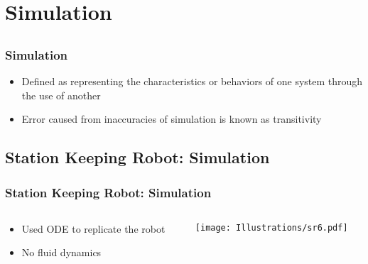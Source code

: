 \documentclass{beamer}
\begin{document}
%


\section{Simulation}

\subsection{}
\begin{frame}
\frametitle{Simulation}
\begin{itemize}
\item Defined as representing the characteristics or behaviors of one system through the use of another
\item Error caused from inaccuracies of simulation is known as transitivity 
\end{itemize}
\end{frame}

\subsection*{Station Keeping Robot: Simulation}
\begin{frame}
  \frametitle{Station Keeping Robot: Simulation}
\begin{columns}
  \begin{column}{0.5\textwidth}
\begin{itemize}
\item  Used ODE to replicate the robot
\item  No fluid dynamics
\end{itemize}
\end{column}
\begin{column}{0.5\textwidth}
 \texttt{[image: Illustrations/sr6.pdf]}
       \\
\end{column}
\end{columns}
\end{frame}
\end{document}
